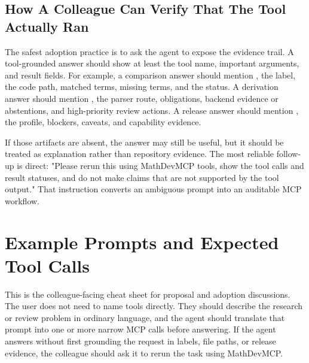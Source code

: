 \documentclass[12pt,a4paper,openany]{book}
\begin{document}
\subsection*{How A Colleague Can Verify That The Tool Actually Ran}

The safest adoption practice is to ask the agent to expose the evidence trail.
A tool-grounded answer should show at least the tool name, important arguments,
and result fields. For example, a comparison answer should mention
, the label, the code path, matched terms, missing
terms, and the status. A derivation answer should mention
, the parser route, obligations, backend
evidence or abstentions, and high-priority review actions. A release answer
should mention , the profile, blockers, caveats, and
capability evidence.

If those artifacts are absent, the answer may still be useful, but it should be
treated as explanation rather than repository evidence. The most reliable
follow-up is direct: "Please rerun this using MathDevMCP tools, show the tool
calls and result statuses, and do not make claims that are not supported by the
tool output." That instruction converts an ambiguous prompt into an auditable
MCP workflow.

\section{Example Prompts and Expected Tool Calls}

This is the colleague-facing cheat sheet for proposal and adoption discussions.
The user does not need to name tools directly. They should describe the research
or review problem in ordinary language, and the agent should translate that
prompt into one or more narrow MCP calls before answering. If the agent answers
without first grounding the request in labels, file paths, or release evidence,
the colleague should ask it to rerun the task using MathDevMCP.
\end{document}
